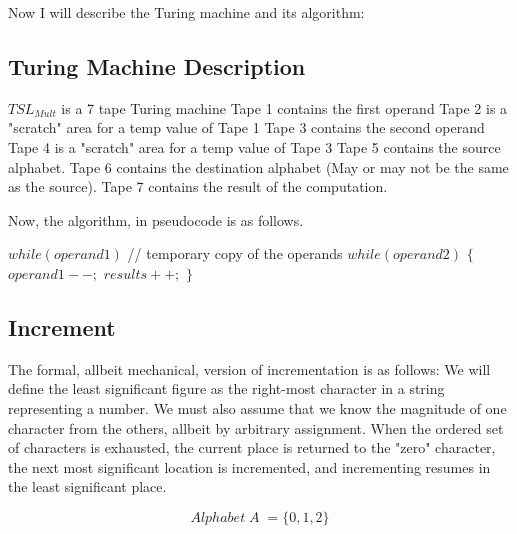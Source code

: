 \documentclass{article}
\begin{document}
Now I will describe the Turing machine and its algorithm:\newline
\subsection{Turing Machine Description}
$TSL_{Mult}$ is a 7 tape Turing machine\newline
Tape 1 contains the first operand\newline
Tape 2 is a "scratch" area for a temp value of Tape 1\newline
Tape 3 contains the second operand \newline
Tape 4 is a "scratch" area for a temp value of Tape 3\newline
Tape 5 contains the source alphabet.\newline
Tape 6 contains the destination alphabet (May or may not be the same as the source).\newline
Tape 7 contains the result of the computation.\newline

Now, the algorithm, in pseudocode is as follows.\newline

$while{(operand1)}$ // temporary copy of the operands \newline
\indent\indent$while{(operand2)}$\newline
\indent\indent$\{$\newline
\indent\indent\indent$operand1--; $\newline
\indent\indent\indent$results++;$\newline
\indent\indent$\}$\newline\newline

\subsection{Increment}
The formal, allbeit mechanical, version of incrementation is as follows:
We will define the least significant figure as the right-most character in a string representing a number. We must also assume that we know the magnitude of one character from the others, allbeit by arbitrary assignment. When the ordered set of characters is exhausted, the current place is returned to the "zero" character, the next most significant location is incremented, and incrementing resumes in the least significant place. 

$$Alphabet\;A\;= \{0,1,2\}$$
\end{document}
